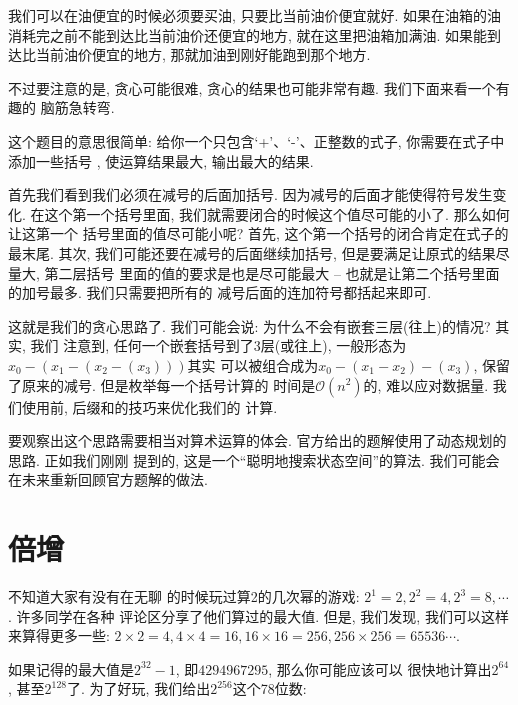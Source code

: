  我们可以在油便宜的时候必须要买油, 只要比当前油价便宜就好. 
如果在油箱的油消耗完之前不能到达比当前油价还便宜的地方, 就在这里把油箱加满油. 
如果能到达比当前油价便宜的地方, 那就加油到刚好能跑到那个地方. 



不过要注意的是, 贪心可能很难, 贪心的结果也可能非常有趣. 我们下面来看一个有趣的
脑筋急转弯. 

这个题目的意思很简单: 给你一个只包含`+'、`-'、正整数的式子, 你需要在式子中添加一些括号
, 使运算结果最大, 输出最大的结果. 

首先我们看到我们必须在减号的后面加括号. 因为减号的后面才能使得符号发生变化. 
在这个第一个括号里面, 我们就需要闭合的时候这个值尽可能的小了. 那么如何让这第一个
括号里面的值尽可能小呢? 首先, 这个第一个括号的闭合肯定在式子的最末尾. 
其次, 我们可能还要在减号的后面继续加括号, 但是要满足让原式的结果尽量大, 第二层括号
里面的值的要求是也是尽可能最大 -- 也就是让第二个括号里面的加号最多. 我们只需要把所有的
减号后面的连加符号都括起来即可. 

这就是我们的贪心思路了. 我们可能会说: 为什么不会有嵌套三层(往上)的情况? 其实, 我们 
注意到, 任何一个嵌套括号到了3层(或往上), 一般形态为$x_0-(x_1-(x_2-(x_3)))$其实
可以被组合成为$x_0-(x_1-x_2)-(x_3)$, 保留了原来的减号. 但是枚举每一个括号计算的
时间是$\mathcal O(n^2)$的, 难以应对数据量. 我们使用前, 后缀和的技巧来优化我们的
计算. 

要观察出这个思路需要相当对算术运算的体会. 官方给出的题解使用了动态规划的思路. 
正如我们刚刚
提到的, 这是一个``聪明地搜索状态空间''的算法. 我们可能会在未来重新回顾官方题解的做法.

\section{倍增}

 不知道大家有没有在无聊
的时候玩过算2的几次幂的游戏: $2^1=2, 2^2=4, 2^3=8, \cdots$. 许多同学在各种
评论区分享了他们算过的最大值. 但是, 我们发现, 我们可以这样来算得更多一些: 
$2\times 2=4, 4\times 4 = 16, 16\times 16=256, 256\times 256=65536\cdots$. 

如果记得的最大值是$2^{32}-1$, 即$4294967295$, 那么你可能应该可以
很快地计算出$2^{64}$, 甚至$2^{128}$了. 为了好玩, 我们给出$2^{256}$这个78位数: 

